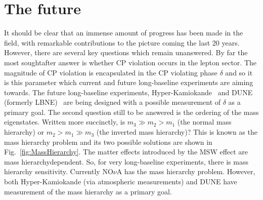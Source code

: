 \section{The future}
\label{sec:NeutrinoFieldFuture}
It should be clear that an immense amount of progress has been made in the field, with remarkable contributions to the picture coming  the last 20 years.  However, there are several key questions which remain unanswered.  
\newline
\newline
By far the most soughtafter answer is whether CP violation occurs in the lepton sector.  The magnitude of CP violation is encapsulated in the CP violating phase $\delta$ and so it is this parameter which current and future long-baseline experiments are aiming towards.   The future long-baseline experiments, Hyper-Kamiokande~\cite{Abe:2014oxa} and DUNE (formerly LBNE)~\cite{Adams:2013qkq} are being designed with a possible measurement of $\delta$ as a primary goal.
\newline
\newline
The second question still to be answered is the ordering of the mass eigenstates.    Written more succinctly, is $m_3 \gg m_2 > m_1$ (the normal mass hierarchy) or $m_2 > m_1 \gg m_3$ (the inverted mass hierarchy)?  This is known as the mass hierarchy problem and its two possible solutions are shown in Fig.~\ref{fig:MassHierarchy}.  The matter effects introduced by the MSW effect are mass hierarchydependent.  So, for very long-baseline experiments, there is mass hierarchy sensitivity.  Currently NO$\nu$A has  the mass hierarchy problem.  However, both Hyper-Kamiokande (via atmospheric measurements) and DUNE have measurement of the mass hierarchy as a primary goal.
